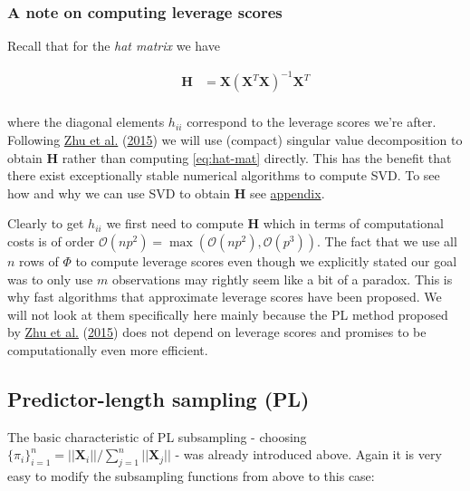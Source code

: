 \documentclass[
]{book}
\begin{document}
\hypertarget{a-note-on-computing-leverage-scores}{%
\subsubsection{A note on computing leverage scores}\label{a-note-on-computing-leverage-scores}}

Recall that for the \emph{hat matrix} we have

\[
\begin{equation} 
\begin{aligned}
&& \mathbf{H}&=\mathbf{X} (\mathbf{X}^T \mathbf{X})^{-1}\mathbf{X}^T \\
\end{aligned}
\label{eq:hat-mat}
\end{equation}
\]

where the diagonal elements \(h_{ii}\) correspond to the leverage scores we're after. Following \protect\hyperlink{ref-zhu2015optimal}{Zhu et al.} (\protect\hyperlink{ref-zhu2015optimal}{2015}) we will use (compact) singular value decomposition to obtain \(\mathbf{H}\) rather than computing \eqref{eq:hat-mat} directly. This has the benefit that there exist exceptionally stable numerical algorithms to compute SVD. To see how and why we can use SVD to obtain \(\mathbf{H}\) see \protect\hyperlink{app-svd}{appendix}.

Clearly to get \(h_{ii}\) we first need to compute \(\mathbf{H}\) which in terms of computational costs is of order \(\mathcal{O}(np^2)=\max(\mathcal{O}(np^2),\mathcal{O}(p^3))\). The fact that we use all \(n\) rows of \(\Phi\) to compute leverage scores even though we explicitly stated our goal was to only use \(m\) observations may rightly seem like a bit of a paradox. This is why fast algorithms that approximate leverage scores have been proposed. We will not look at them specifically here mainly because the PL method proposed by \protect\hyperlink{ref-zhu2015optimal}{Zhu et al.} (\protect\hyperlink{ref-zhu2015optimal}{2015}) does not depend on leverage scores and promises to be computationally even more efficient.

\hypertarget{predictor-length-sampling-pl}{%
\subsection{Predictor-length sampling (PL)}\label{predictor-length-sampling-pl}}

The basic characteristic of PL subsampling - choosing \(\{\pi_i\}^n_{i=1}= ||\mathbf{X}_i||/ \sum_{j=1}^{n}||\mathbf{X}_j||\) - was already introduced above. Again it is very easy to modify the subsampling functions from above to this case:
\end{document}
